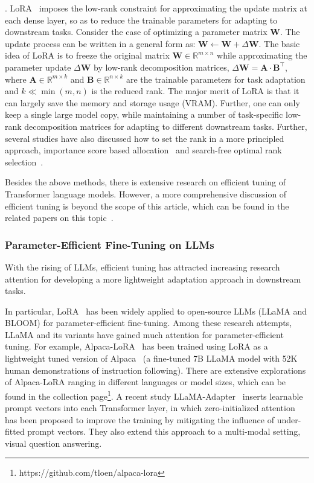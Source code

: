 . LoRA~\cite{Hu-ICLR-2022-LoRA} imposes  the low-rank constraint for approximating the update matrix at each dense layer, so as to reduce the trainable parameters  for adapting to downstream tasks. 
Consider the case of optimizing a parameter matrix $\mathbf{W}$. The update process can be written in a general form as:   $\mathbf{W} \leftarrow \mathbf{W} + \Delta \mathbf{W}$. 
The basic idea of LoRA is to freeze the original matrix $\mathbf{W} \in \mathbb{R}^{m \times n}$ while approximating the parameter update $\Delta \mathbf{W}$ by low-rank decomposition matrices, \ie $\Delta \mathbf{W}=\mathbf{A}\cdot  \mathbf{B}^\top$, where $\mathbf{A}\in \mathbb{R}^{m \times k}$ and $\mathbf{B}\in \mathbb{R}^{n \times k}$ are the trainable  parameters for task adaptation and $k \ll \min(m,n)$ is the reduced rank. The major merit of LoRA is that it can largely save the memory and storage usage (\eg VRAM). Further, one can only keep a single large model copy, while maintaining a number of task-specific low-rank decomposition matrices for adapting to different downstream tasks.
Further, several studies have also discussed how to set the rank in a more principled approach, \eg  importance score based allocation~\cite{Zhang-arXiv-2023-Adaptive} and search-free optimal rank selection~\cite{Valipour-arXiv-2022-DyLoRA}.

Besides the above  methods, there is  extensive research on efficient tuning of Transformer language models.  
 However, a more comprehensive discussion  of efficient tuning is beyond the scope of this article, which can be found in the related papers on this topic~\cite{He-ICLR-2022-towards,Ding-NMI-2023-Parameter}.  
 



\subsubsection{Parameter-Efficient Fine-Tuning on LLMs}
With the rising of LLMs, efficient tuning  has attracted increasing research attention for developing a more lightweight adaptation approach in downstream tasks. 


In particular, LoRA~\cite{Hu-ICLR-2022-LoRA} has been widely applied to open-source LLMs (\eg LLaMA and BLOOM) for parameter-efficient fine-tuning. 
Among these research attempts, LLaMA and its  variants have  gained much attention for parameter-efficient tuning.  
For example, Alpaca-LoRA~\cite{Alpaca-LoRA} has been trained using LoRA as a lightweight tuned  version of  Alpaca~\cite{Taori-github-2023-Stanford} (a fine-tuned 7B LLaMA model with 52K human demonstrations of instruction following).  
There are extensive explorations of Alpaca-LoRA ranging in different languages or model sizes, which can be found in the collection page\footnote{https://github.com/tloen/alpaca-lora}. 
 A recent study LLaMA-Adapter~\cite{Zhang-arXiv-2023-LLaMA-Adapter} inserts  learnable prompt vectors into each Transformer layer, in which zero-initialized attention has been proposed to improve the training by mitigating the influence of under-fitted prompt vectors. They  also extend this approach to a multi-modal setting, \eg visual question answering.   

